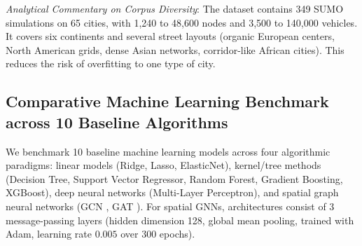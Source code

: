 \documentclass[journal]{IEEEtran}
\begin{document}
\begin{table}[htbp]
\caption{Global Multi-City Simulation Corpus Distribution and Topological Diversity}
\label{tab:corpus_summary}
\centering
{}
\end{table}

\textit{Analytical Commentary on Corpus Diversity}:
The dataset contains 349 SUMO simulations on 65 cities, with 1,240 to 48,600 nodes and 3,500 to 140,000 vehicles. It covers six continents and several street layouts (organic European centers, North American grids, dense Asian networks, corridor-like African cities). This reduces the risk of overfitting to one type of city.

\subsection{Comparative Machine Learning Benchmark across 10 Baseline Algorithms}
We benchmark 10 baseline machine learning models across four algorithmic paradigms: linear models (Ridge, Lasso, ElasticNet), kernel/tree methods (Decision Tree, Support Vector Regressor, Random Forest, Gradient Boosting, XGBoost), deep neural networks (Multi-Layer Perceptron), and spatial graph neural networks (GCN \cite{Kipf2017}, GAT \cite{Velickovic2018}). For spatial GNNs, architectures consist of 3 message-passing layers (hidden dimension 128, global mean pooling, trained with Adam, learning rate $0.005$ over 300 epochs).
\end{document}
